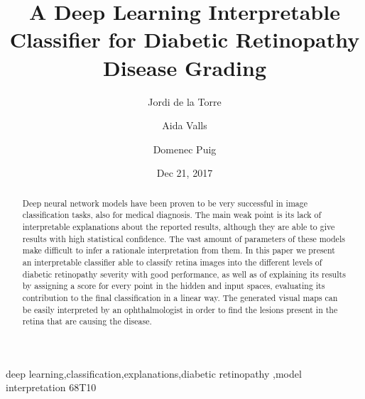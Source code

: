 \documentclass[preprint]{elsarticle}
\theoremstyle{definition} %
\theoremstyle{remark}
\begin{document}
\begin{frontmatter}

\title{A Deep Learning Interpretable Classifier for Diabetic Retinopathy Disease Grading}

\author[rvt]{Jordi de la Torre}
\author[rvt]{Aida Valls}
\author[rvt]{Domenec Puig}


\address[rvt]{Departament d'Enginyeria Inform\`atica i Matem\`atiques.\\Escola T\`ecnica Superior d'Enginyeria.\\Universitat Rovira i Virgili\\Avinguda Paisos Catalans, 26. E-43007\\
Tarragona, Spain}

\date{Dec 21, 2017}

\begin{abstract}
Deep neural network models have been proven to be very successful in image classification tasks, also for medical diagnosis. The main weak point is its lack of interpretable explanations about the reported results, although they are able to give results with high statistical confidence. The vast amount of parameters of these models make difficult to infer a rationale interpretation from them. In this paper we present an interpretable classifier able to classify retina images into the different levels of diabetic retinopathy severity with good performance, as well as of explaining its results by assigning a score for every point in the hidden and input spaces, evaluating its contribution to the final classification in a linear way. The generated visual maps can be easily interpreted by an ophthalmologist in order to find the lesions present in the retina that are causing the disease.
\end{abstract}

\begin{keyword}
deep learning\sep classification\sep explanations\sep diabetic retinopathy \sep model interpretation
\MSC[2010] 68T10
\end{keyword}

\end{frontmatter}

\end{document}
